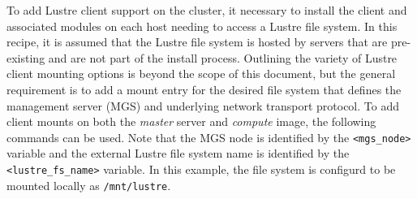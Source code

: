 To add Lustre client support on the cluster, it necessary to install the client
and associated modules on each host needing to access a Lustre file system.  In
this recipe, it is assumed that the Lustre file system is hosted by servers
that are pre-existing and are not part of the install process. Outlining the
variety of Lustre client mounting options is beyond the scope of this document,
but the general requirement is to add a mount entry for the desired file system
that defines the management server (MGS) and underlying network transport
protocol.  To add client mounts on both the {\em master} server and {\em
compute} image, the following commands can be used. Note that the MGS node is
identified by the \texttt{<mgs\_node>} variable and the external Lustre file
system name is identified by the \texttt{<lustre\_fs\_name>} variable. In this
example, the file system is configurd to be mounted locally
as \texttt{/mnt/lustre}.
